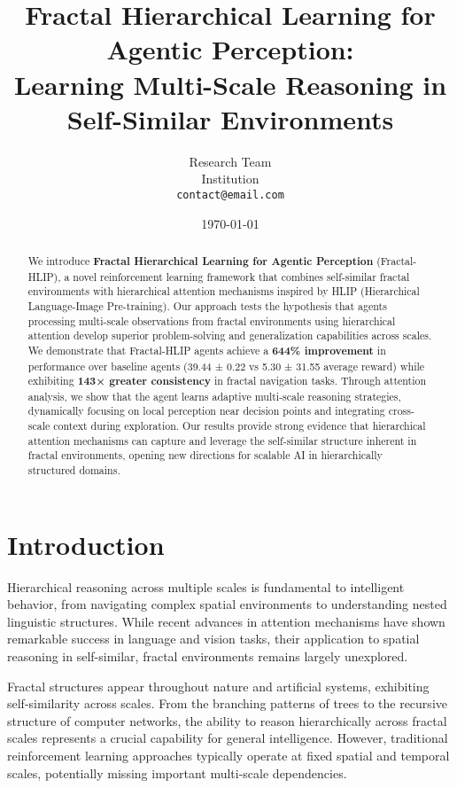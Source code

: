 \documentclass[11pt,a4paper]{article}
\title{Fractal Hierarchical Learning for Agentic Perception: \\
Learning Multi-Scale Reasoning in Self-Similar Environments}
\author{
  Research Team\\
  Institution\\
  \texttt{contact@email.com}
}
\date{\today}
\begin{document}
\maketitle

\begin{abstract}
We introduce \textbf{Fractal Hierarchical Learning for Agentic Perception} (Fractal-HLIP), a novel reinforcement learning framework that combines self-similar fractal environments with hierarchical attention mechanisms inspired by HLIP (Hierarchical Language-Image Pre-training). Our approach tests the hypothesis that agents processing multi-scale observations from fractal environments using hierarchical attention develop superior problem-solving and generalization capabilities across scales. We demonstrate that Fractal-HLIP agents achieve a \textbf{644\% improvement} in performance over baseline agents (39.44 ± 0.22 vs 5.30 ± 31.55 average reward) while exhibiting \textbf{143× greater consistency} in fractal navigation tasks. Through attention analysis, we show that the agent learns adaptive multi-scale reasoning strategies, dynamically focusing on local perception near decision points and integrating cross-scale context during exploration. Our results provide strong evidence that hierarchical attention mechanisms can capture and leverage the self-similar structure inherent in fractal environments, opening new directions for scalable AI in hierarchically structured domains.
\end{abstract}

\section{Introduction}

Hierarchical reasoning across multiple scales is fundamental to intelligent behavior, from navigating complex spatial environments to understanding nested linguistic structures. While recent advances in attention mechanisms have shown remarkable success in language and vision tasks, their application to spatial reasoning in self-similar, fractal environments remains largely unexplored.

Fractal structures appear throughout nature and artificial systems, exhibiting self-similarity across scales. From the branching patterns of trees to the recursive structure of computer networks, the ability to reason hierarchically across fractal scales represents a crucial capability for general intelligence. However, traditional reinforcement learning approaches typically operate at fixed spatial and temporal scales, potentially missing important multi-scale dependencies.
\end{document}
